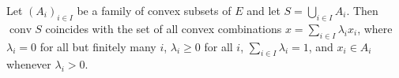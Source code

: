 Let $(A_i)_{i \in I}$ be a family of convex subsets of $E$ and let $S = \bigcup_{i \in I} A_i$. Then $\operatorname{conv} S$ coincides with the set of all convex combinations $x = \sum_{i \in I} \lambda_i x_i$, where $\lambda_i = 0$ for all but finitely many $i$, $\lambda_i \geq 0$ for all $i$, $\sum_{i \in I} \lambda_i = 1$, and $x_i \in A_i$ whenever $\lambda_i > 0$.